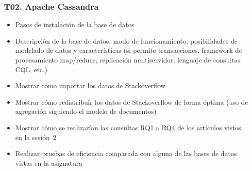 \begin{frame}
  \frametitle{T02. Apache Cassandra}
  \begin{itemize}
  \item Pasos de instalación de la base de datos
  \item Descripción de la base de datos, modo de funcionamiento,
    posibilidades de modelado de datos y características (si permite
    transacciones, framework de procesamiento map/reduce, replicación
    multiservidor, lenguaje de consultas CQL, etc.)
  \item Mostrar cómo importar los datos de Stackoverflow
  \item Mostrar cómo redistribuir los datos de Stackoverflow de forma
    óptima (uso de agregación siguiendo el modelo de documentos)
  \item Mostrar cómo se realizarían las consultas RQ1 a RQ4 de los
    artículos vistos en la sesión~2
  \item Realizar pruebas de eficiencia comparada con alguna de las bases de
    datos vistas en la asignatura
  \end{itemize}
\end{frame}




